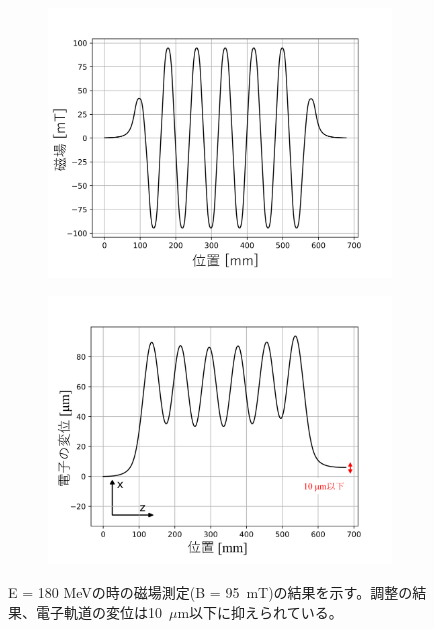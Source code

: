 \documentclass[a4paper,11pt,uplatex]{jsbook}
\begin{document}
\begin{figure}[H]
  \centering
  \begin{subfigure}[h]{0.45\linewidth}
    \centering
    \includegraphics[width=\linewidth]{image/3-undulator_filed.png}
  \end{subfigure}
  \hfill
  \begin{subfigure}[h]{0.45\linewidth}
    \centering
    \includegraphics[width=\linewidth]{image/3-undulator_position.png}
  \end{subfigure}
  \caption[ホールプローブによる磁場測定の結果]{E = 180 MeVの時の磁場測定(B = 95~mT)の結果を示す。調整の結果、電子軌道の変位は10~$\mu$m以下に抑えられている。}
  \label{fig:magnetic}
\end{figure}
\end{document}
